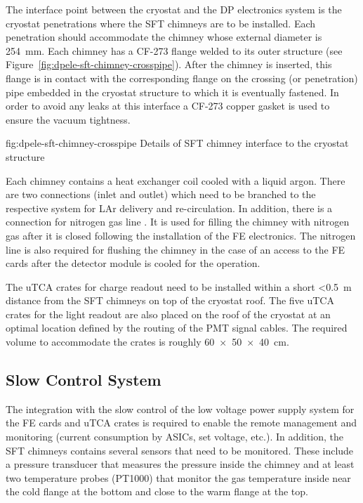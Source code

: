 The interface point between the cryostat and the DP electronics system is the cryostat penetrations where the SFT chimneys are to be installed. Each penetration should accommodate the chimney whose external diameter is \SI{254}{\mm}. Each chimney has a CF-273  flange welded to its outer structure (see Figure~\ref{fig:dpele-sft-chimney-crosspipe}). After the chimney is inserted, this flange is in contact with the corresponding flange on the crossing (or penetration) pipe embedded in the cryostat structure to which it is eventually fastened. In order to avoid any leaks at this interface a CF-273 copper gasket is used to ensure the vacuum tightness.  

\begin{dunefigure}{fig:dpele-sft-chimney-crosspipe}
{Details of SFT chimney interface to the cryostat structure}
\end{dunefigure}

Each chimney contains a heat exchanger coil cooled with a liquid argon. There are two  connections (inlet and outlet) which need to be branched to the respective system for LAr delivery and re-circulation. In addition, there is a connection for nitrogen gas line . It is used for filling the chimney with nitrogen gas after it is closed following the installation of the FE electronics. The nitrogen line is also required for flushing the chimney in the case of an access to the FE cards after the detector module is cooled for the operation. 

The uTCA crates for charge readout need to be installed within a short \SI{<0.5}{\meter} distance from the SFT chimneys on top of the cryostat roof. The five uTCA crates for the light readout are also placed on the roof of the cryostat at an optimal location defined by the routing of the PMT signal cables. The required volume to accommodate the crates is roughly \SI[product-units=power]{60x50x40}{\cm}. 

\subsection{Slow Control System}
\label{sec:fddp-tpc-elec-intfc-sc}

The integration with the slow control of the low voltage power supply system for the FE cards and uTCA crates is required to enable the remote management and monitoring (current consumption by ASICs, set voltage, etc.). In addition, the SFT chimneys contains several sensors that need to be monitored. These include a pressure transducer that measures the pressure inside the chimney and at least two temperature probes (PT1000) that monitor the gas temperature inside near the cold flange at the bottom and close to the warm flange at the top.  

